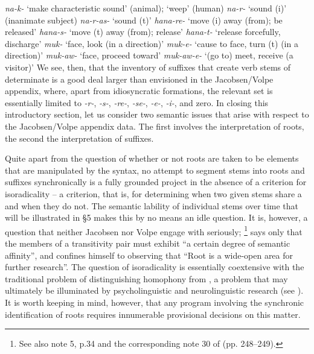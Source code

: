 \documentclass[output=paper,
modfonts
]{LSP/langsci}
\begin{document}
\ea \label{ex:dechene:12}
	 \ea \label{ex:dechene:12a} \textit{na-k-} `make characteristic sound' (animal); `weep' (human)
	 \ex \label{ex:dechene:12b} \textit{na-r-} `sound (i)' (inanimate subject)
	 \ex \label{ex:dechene:12c} \textit{na-r-as-} `sound (t)'
	\z
\ex \label{ex:dechene:13} 
	 \ea \label{ex:dechene:13a} \textit{hana-re-} `move (i) away (from); be released'
	 \ex \label{ex:dechene:13b} \textit{hana-s-} `move (t) away (from); release'
	 \ex \label{ex:dechene:13c} \textit{hana-t-} `release forcefully, discharge'
	\z
\ex \label{ex:dechene:14} 
	 \ea \label{ex:dechene:14a} \textit{muk-} `face, look (in a direction)'
	 \ex \label{ex:dechene:14b} \textit{muk-e-} `cause to face, turn (t) (in a direction)'
	 \ex \label{ex:dechene:14c} \textit{muk-aw-} `face, proceed toward'
	 \ex \label{ex:dechene:14d} \textit{muk-aw-e-} `(go to) meet, receive (a visitor)'
	\z
\z
We see, then, that the inventory of suffixes that create verb stems of
determinate  is a good deal larger than envisioned in the
Jacobsen/Volpe appendix, where, apart from idiosyncratic formations, the
relevant set is essentially limited to \textit{-r-}, \textit{-s-},
\textit{-re-}, \textit{-se-}, \textit{-e-}, \textit{-i-}, and zero. In closing
this introductory section, let us consider two semantic issues that
arise with respect to the Jacobsen/Volpe appendix data. The first
involves the interpretation of roots, the second the interpretation of
suffixes.

Quite apart from the question of whether or not roots are taken to be
elements that are manipulated by the syntax, no attempt to segment stems
into roots and suffixes synchronically is a fully grounded project in
the absence of a criterion for isoradicality -- a criterion, that is, for
determining when two given stems share a  and when they do not. The
semantic lability of individual stems over time that will be illustrated
in \S5 makes this by no means an idle question. It is, however, a
question that neither Jacobsen nor Volpe engage with seriously; \citet[38]{jacobsen1982a}\footnote{See also note 5, p.34 and the corresponding note 30 of
  \citealt{jacobsen1992a} (pp. 248--249).} says only that the members of a transitivity
pair must exhibit ``a certain degree of semantic affinity'', and \citet[32]{volpe2005a} confines himself to observing that ``Root  is a
wide-open area for further research''. The question of isoradicality is
essentially coextensive with the traditional problem of distinguishing
homophony from , a problem that may ultimately be illuminated by
psycholinguistic and neurolinguistic research (see \citealt[103]{marantz2013a}). It
is worth keeping in mind, however, that any program involving the
synchronic identification of roots requires innumerable provisional
decisions on this matter.
\end{document}
